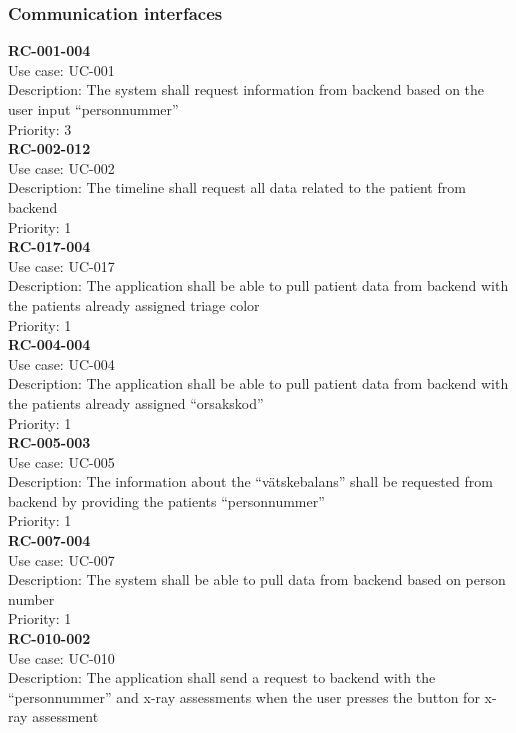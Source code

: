 \subsubsection{Communication interfaces}
\textbf{RC-001-004}\\
Use case: UC-001\\
Description: The system shall request information from backend based on the user input “personnummer” \\
Priority: 3\\
\newline
\textbf{RC-002-012} \\
Use case: UC-002 \\
Description: The timeline shall request all data related to the patient from backend \\
Priority: 1 \\
\newline
\textbf{RC-017-004} \\
Use case: UC-017 \\
Description: The application shall be able to pull patient data from backend with the patients already assigned triage color  \\
Priority: 1 \\
\newline
\textbf{RC-004-004} \\
Use case: UC-004 \\
Description: The application shall be able to pull patient data from backend with the patients already assigned “orsakskod” \\
Priority: 1 \\
\newline
\textbf{RC-005-003} \\
Use case: UC-005 \\
Description: The information about the “vätskebalans” shall be requested from backend by providing the patients “personnummer”\\
Priority: 1 \\
\newline
\textbf{RC-007-004} \\
Use case: UC-007 \\
Description: The system shall be able to pull data from backend based on person number\\
Priority: 1 \\
\newline
\textbf{RC-010-002} \\
Use case: UC-010 \\
Description: The application shall send a request to backend with the “personnummer” and x-ray assessments when the user presses the button for x-ray assessment \\
